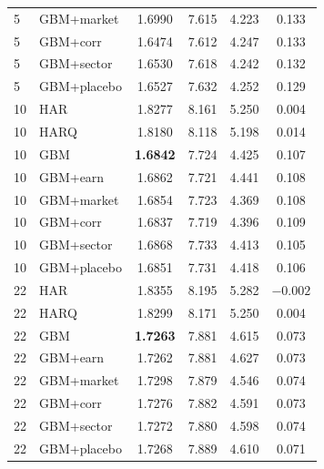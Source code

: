\documentclass{llncs}
\begin{document}
\begin{table}[t]
\begin{tabular}{llcccc}
5  & GBM+market  & 1.6990 & 7.615 & 4.223 & 0.133 \\
5  & GBM+corr    & 1.6474 & 7.612 & 4.247 & 0.133 \\
5  & GBM+sector  & 1.6530 & 7.618 & 4.242 & 0.132 \\
5  & GBM+placebo & 1.6527 & 7.632 & 4.252 & 0.129 \\
\midrule
10 & HAR         & 1.8277 & 8.161 & 5.250 & 0.004 \\
10 & HARQ        & 1.8180 & 8.118 & 5.198 & 0.014 \\
10 & GBM         & \textbf{1.6842} & 7.724 & 4.425 & 0.107 \\
10 & GBM+earn    & 1.6862 & 7.721 & 4.441 & 0.108 \\
10 & GBM+market  & 1.6854 & 7.723 & 4.369 & 0.108 \\
10 & GBM+corr    & 1.6837 & 7.719 & 4.396 & 0.109 \\
10 & GBM+sector  & 1.6868 & 7.733 & 4.413 & 0.105 \\
10 & GBM+placebo & 1.6851 & 7.731 & 4.418 & 0.106 \\
\midrule
22 & HAR         & 1.8355 & 8.195 & 5.282 & $-0.002$ \\
22 & HARQ        & 1.8299 & 8.171 & 5.250 & 0.004 \\
22 & GBM         & \textbf{1.7263} & 7.881 & 4.615 & 0.073 \\
22 & GBM+earn    & 1.7262 & 7.881 & 4.627 & 0.073 \\
22 & GBM+market  & 1.7298 & 7.879 & 4.546 & 0.074 \\
22 & GBM+corr    & 1.7276 & 7.882 & 4.591 & 0.073 \\
22 & GBM+sector  & 1.7272 & 7.880 & 4.598 & 0.074 \\
22 & GBM+placebo & 1.7268 & 7.889 & 4.610 & 0.071 \\
\bottomrule
\end{tabular}
\end{table}
\end{document}

